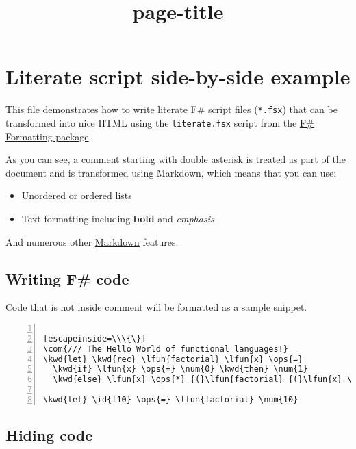 \documentclass{article}
\title{{page-title}}
\date{}
\newcommand{\id}[1]{\textcolor{black}{#1}}
\newcommand{\com}[1]{\textcolor{officegreen}{#1}}
\newcommand{\kwd}[1]{\textcolor{navy}{#1}}
\newcommand{\num}[1]{\textcolor{officegreen}{#1}}
\newcommand{\ops}[1]{\textcolor{purple}{#1}}
\begin{document}
\maketitle

\section*{Literate script side-by-side example}



This file demonstrates how to write literate F\# script
files (\texttt{*.fsx}) that can be transformed into nice HTML
using the \texttt{literate.fsx} script from the \href{http://fsprojects.github.io/FSharp.Formatting}{F\# Formatting
package}.


As you can see, a comment starting with double asterisk
is treated as part of the document and is transformed
using Markdown, which means that you can use:
\begin{itemize}
\item Unordered or ordered lists

\item Text formatting including \textbf{bold} and \emph{emphasis}

\end{itemize}



And numerous other \href{http://daringfireball.net/projects/markdown}{Markdown} features.
\subsection*{Writing F\# code}



Code that is not inside comment will be formatted as
a sample snippet.
\begin{lstlisting}[numbers=left]

[escapeinside=\\\{\}]
\com{/// The Hello World of functional languages!}
\kwd{let} \kwd{rec} \lfun{factorial} \lfun{x} \ops{=} 
  \kwd{if} \lfun{x} \ops{=} \num{0} \kwd{then} \num{1} 
  \kwd{else} \lfun{x} \ops{*} {(}\lfun{factorial} {(}\lfun{x} \ops{-} \num{1}{)}{)}

\kwd{let} \id{f10} \ops{=} \lfun{factorial} \num{10}

\end{lstlisting}

\subsection*{Hiding code}
\end{document}
